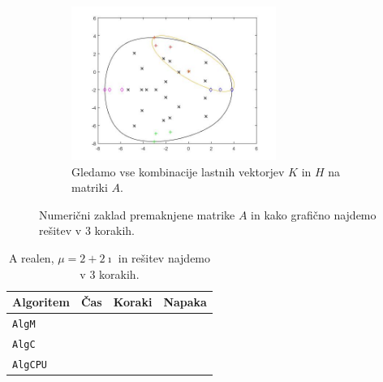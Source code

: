 \documentclass[12pt,a4paper]{amsart}
\theoremstyle{definition}
\theoremstyle{plain}
\begin{document}
\begin{figure}[H]
\begin{subfigure}[t]{0.45\textwidth}
\label{fig:p53}
\end{subfigure}%
\hfill
\begin{subfigure}[t]{0.45\textwidth}
\includegraphics[width=0.9\linewidth,height=5cm]{RC3e3.jpg}
\caption{Gledamo vse kombinacije lastnih vektorjev $K$ in $H$ na matriki $A$.\footnotemark[\value{footnote}]}
\label{fig:p53}
\end{subfigure}
\caption{Numerični zaklad premaknjene matrike $A$ in kako grafično najdemo rešitev v 3 korakih.}
\end{figure}

\begin{table}[H]
\begin{tabular}{|l|l|c|r|}
\hline
Algoritem & Čas & Koraki & Napaka\\
\hline
\hline
\verb+AlgM+ & & & \\
\hline
\verb+AlgC+ & & & \\
\hline
\verb+AlgCPU+ & & & \\
\hline
\end{tabular}
\caption{A realen, $\mu = 2 + 2\imath$ in rešitev najdemo v 3 korakih.}
\label{t5}
\end{table}
\end{document}
